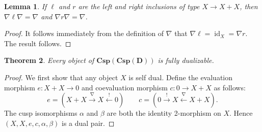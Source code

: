\documentclass[11pt]{amsart}
\newcommand{\from}{\colon}
\newcommand{\xto}[1]{\xrightarrow{#1}}
\newcommand{\bicspcsp}[1]{\mathbf{Csp(Csp(#1))}}
\DeclareMathOperator{\id}{id}
\newtheorem{thm}{Theorem}[section]
\newtheorem{lem}[thm]{Lemma}
\theoremstyle{remark}
\theoremstyle{definition}
\begin{document}
\begin{lem}
	If $\ell$ and $r$ are the 
	left and right inclusions of type $X \to X+X$, 
	then $\nabla \ell \nabla = \nabla$ 
	and $\nabla r \nabla = \nabla$.
\end{lem}

\begin{proof}
	It follows immediately from 
	the definition of $\nabla$ that 
	$\nabla \ell = \id_X = \nabla r$.  
	The result follows.  
\end{proof}

\begin{thm}
	\label{thm:SpansSpansAreFullyDualBicat}
	Every object of $\bicspcsp{D}$ is fully dualizable.
\end{thm}

\begin{proof}
	We first show that any object $X$ is self dual.  
	Define the evaluation morphism 
		$e \from X+X \to 0$ 
	and coevaluation morphism 
		$c \from 0 \to X+X$ 
	as follows:
	\[
		e = (X+X \xto{\nabla} X \xleftarrow{!} 0)
		\quad \quad
		c = (0 \xto{!} X \xleftarrow{\nabla} X+X ).
	\]
	The cusp isomorphisms 
		$\alpha$ and $\beta$ 
	are both the identity 2-morphism on $X$. 
	Hence $(X,X,e,c,\alpha,\beta)$ is a dual pair.
	

\end{proof}
\end{document}
